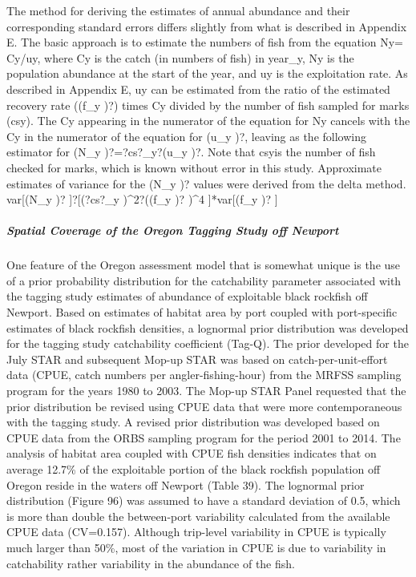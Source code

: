 \documentclass[11pt,
  english,
  letterpaper,
]{article}
\begin{document}
The method for deriving the estimates of annual abundance and their corresponding standard errors differs slightly from what is described in Appendix E. The basic approach is to estimate the numbers of fish from the equation Ny= Cy/uy, where Cy is the catch (in numbers of fish) in year\_y, Ny is the population abundance at the start of the year, and uy is the exploitation rate. As described in Appendix E, uy can be estimated from the ratio of the estimated recovery rate ((f\_y )?) times Cy divided by the number of fish sampled for marks (csy). The Cy appearing in the numerator of the equation for Ny cancels with the Cy in the numerator of the equation for (u\_y )?, leaving as the following estimator for (N\_y )?=?cs?\_y?(u\_y )?. Note that csyis the number of fish checked for marks, which is known without error in this study. Approximate estimates of variance for the (N\_y )? values were derived from the delta method. var{[}(N\_y )? {]}?{[}(?cs?\_y )\^{}2?((f\_y )? )\^{}4 {]}*var{[}(f\_y )? {]}

\hypertarget{spatial-coverage-of-the-oregon-tagging-study-off-newport}{%
\subparagraph{Spatial Coverage of the Oregon Tagging Study off Newport}\label{spatial-coverage-of-the-oregon-tagging-study-off-newport}}

One feature of the Oregon assessment model that is somewhat unique is the use of a prior probability distribution for the catchability parameter associated with the tagging study estimates of abundance of exploitable black rockfish off Newport. Based on estimates of habitat area by port coupled with port-specific estimates of black rockfish densities, a lognormal prior distribution was developed for the tagging study catchability coefficient (Tag-Q). The prior developed for the July STAR and subsequent Mop-up STAR was based on catch-per-unit-effort data (CPUE, catch numbers per angler-fishing-hour) from the MRFSS sampling program for the years 1980 to 2003. The Mop-up STAR Panel requested that the prior distribution be revised using CPUE data that were more contemporaneous with the tagging study. A revised prior distribution was developed based on CPUE data from the ORBS sampling program for the period 2001 to 2014. The analysis of habitat area coupled with CPUE fish densities indicates that on average 12.7\% of the exploitable portion of the black rockfish population off Oregon reside in the waters off Newport (Table 39). The lognormal prior distribution (Figure 96) was assumed to have a standard deviation of 0.5, which is more than double the between-port variability calculated from the available CPUE data (CV=0.157). Although trip-level variability in CPUE is typically much larger than 50\%, most of the variation in CPUE is due to variability in catchability rather variability in the abundance of the fish.
\end{document}
